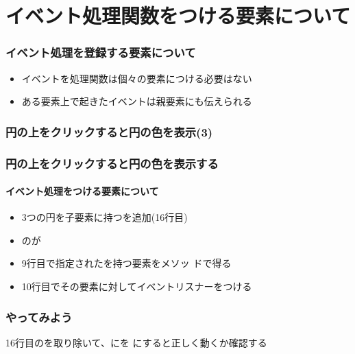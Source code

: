 

\frame{\maketitle}
\section{イベント処理関数をつける要素について}
\begin{frame}[containsverbatim]
 \frametitle{イベント処理を登録する要素について}
\begin{itemize}
 \item イベントを処理関数は個々の要素につける必要はない
 \item ある要素上で起きたイベントは親要素にも伝えられる
\end{itemize}
\end{frame}
\begin{frame}[containsverbatim]
 \frametitle{円の上をクリックすると円の色を表示(3)%
 }
\end{frame}
\begin{frame}[containsverbatim]
 \frametitle{円の上をクリックすると円の色を表示する}
 \framesubtitle{イベント処理をつける要素について}
\begin{itemize}
 \item 3つの円を子要素に持つを追加(16行目)
 \item {}のが
 \item 9行目で指定されたを持つ要素をメソッ
       ドで得る
 \item 10行目でその要素に対してイベントリスナーをつける
\end{itemize}
\end{frame}
\begin{frame}[containsverbatim]
 \frametitle{やってみよう}
 16行目のを取り除いて、にを
				にすると正しく動くか確認する
\end{frame}
